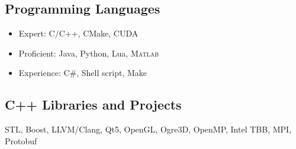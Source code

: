 \subsection{Programming Languages}
\begin{itemize}
\item Expert: C/C++, CMake, CUDA
\item Proficient: Java, Python, Lua, \textsc{Matlab}
\item Experience: C\#, Shell script, Make
\end{itemize}

\subsection{C++ Libraries and Projects}
STL, Boost, LLVM/Clang, Qt5, OpenGL, Ogre3D, OpenMP, Intel TBB, MPI, Protobuf

